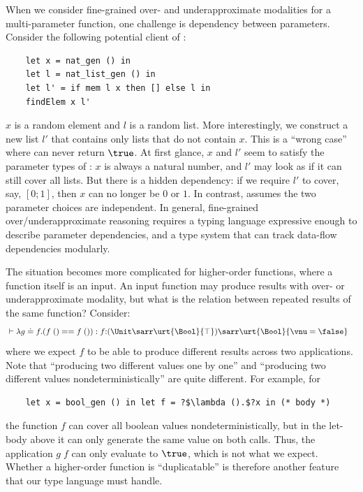 When we consider fine-grained over- and underapproximate modalities for a multi-parameter function, one challenge is dependency between parameters.
Consider the following potential client of :
\begin{verbatim}
    let x = nat_gen () in
    let l = nat_list_gen () in
    let l' = if mem l x then [] else l in
    findElem x l'
\end{verbatim}
$x$ is a random element and $l$ is a random list.
More interestingly, we construct a new list $l'$ that contains only lists that do not contain $x$.
This is a ``wrong case'' where  can never return $\true$.
At first glance, $x$ and $l'$ seem to satisfy the parameter types of : $x$ is always a natural number, and $l'$ may look as if it can still cover all lists.
But there is a hidden dependency: if we require $l'$ to cover, say, $[0;1]$, then $x$ can no longer be $0$ or $1$.
In contrast,  assumes the two parameter choices are independent.
In general, fine-grained over/underapproximate reasoning requires a typing language expressive enough to describe parameter dependencies, and a type system that can track data-flow dependencies modularly.

The situation becomes more complicated for higher-order functions, where a function itself is an input.
An input function may produce results with over- or underapproximate modality, but what is the relation between repeated results of the same function?
Consider:
\begin{align*}
    &\vdash \lambda g \doteq f.(f\;() == f\;()) : f{:}(\Unit\sarr\urt{\Bool}{\top})\sarr\urt{\Bool}{\vnu = \false}
\end{align*}\noindent
where we expect $f$ to be able to produce different results across two applications.
Note that ``producing two different values one by one'' and ``producing two different values nondeterministically'' are quite different.
For example, for
\begin{verbatim}
    let x = bool_gen () in let f = ?$\lambda ().$?x in (* body *)
\end{verbatim}
the function $f$ can cover all boolean values nondeterministically, but in the let-body above it can only generate the same value on both calls.
Thus, the application \(g\;f\) can only evaluate to $\true$, which is not what we expect.
Whether a higher-order function is ``duplicatable'' is therefore another feature that our type language must handle.

